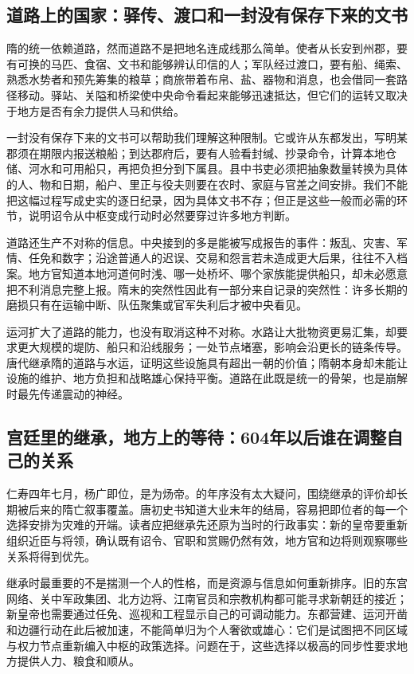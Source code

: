 \subsection{道路上的国家：驿传、渡口和一封没有保存下来的文书}
隋的统一依赖道路，然而道路不是把地名连成线那么简单。使者从长安到州郡，要有可换的马匹、食宿、文书和能够辨认印信的人；军队经过渡口，要有船、绳索、熟悉水势者和预先筹集的粮草；商旅带着布帛、盐、器物和消息，也会借同一套路径移动。驿站、关隘和桥梁使中央命令看起来能够迅速抵达，但它们的运转又取决于地方是否有余力提供人马和供给。

一封没有保存下来的文书可以帮助我们理解这种限制。它或许从东都发出，写明某郡须在期限内报送粮船；到达郡府后，要有人验看封缄、抄录命令，计算本地仓储、河水和可用船只，再把负担分到下属县。县中书吏必须把抽象数量转换为具体的人、物和日期，船户、里正与役夫则要在农时、家庭与官差之间安排。我们不能把这幅过程写成史实的逐日纪录，因为具体文书不存；但正是这些一般而必需的环节，说明诏令从中枢变成行动时必然要穿过许多地方判断。

道路还生产不对称的信息。中央接到的多是能被写成报告的事件：叛乱、灾害、军情、任免和数字；沿途普通人的迟误、交易和怨言若未造成更大后果，往往不入档案。地方官知道本地河道何时浅、哪一处桥坏、哪个家族能提供船只，却未必愿意把不利消息完整上报。隋末的突然性因此有一部分来自记录的突然性：许多长期的磨损只有在运输中断、队伍聚集或官军失利后才被中央看见。

运河扩大了道路的能力，也没有取消这种不对称。水路让大批物资更易汇集，却要求更大规模的堤防、船只和沿线服务；一处节点堵塞，影响会沿更长的链条传导。唐代继承隋的道路与水运，证明这些设施具有超出一朝的价值；隋朝本身却未能让设施的维护、地方负担和战略雄心保持平衡。道路在此既是统一的骨架，也是崩解时最先传递震动的神经。

\subsection{宫廷里的继承，地方上的等待：604年以后谁在调整自己的关系}
仁寿四年七月，杨广即位，是为炀帝。的年序没有太大疑问，围绕继承的评价却长期被后来的隋亡叙事覆盖。唐初史书知道大业末年的结局，容易把即位者的每一个选择安排为灾难的开端。读者应把继承先还原为当时的行政事实：新的皇帝要重新组织近臣与将领，确认既有诏令、官职和赏赐仍然有效，地方官和边将则观察哪些关系将得到优先。

继承时最重要的不是揣测一个人的性格，而是资源与信息如何重新排序。旧的东宫网络、关中军政集团、北方边将、江南官员和宗教机构都可能寻求新朝廷的接近；新皇帝也需要通过任免、巡视和工程显示自己的可调动能力。东都营建、运河开凿和边疆行动在此后被加速，不能简单归为个人奢欲或雄心：它们是试图把不同区域与权力节点重新编入中枢的政策选择。问题在于，这些选择以极高的同步性要求地方提供人力、粮食和顺从。


